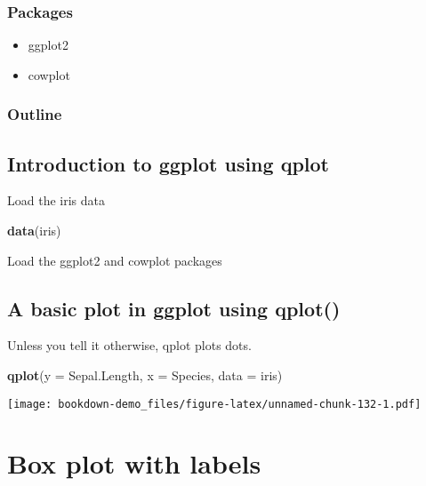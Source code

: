 \documentclass[]{book}
\newenvironment{Shaded}{\begin{snugshade}}{\end{snugshade}}
\newcommand{\KeywordTok}[1]{\textcolor[rgb]{0.13,0.29,0.53}{\textbf{#1}}}
\newcommand{\DataTypeTok}[1]{\textcolor[rgb]{0.13,0.29,0.53}{#1}}
\newcommand{\NormalTok}[1]{#1}
\providecommand{\tightlist}{%
  \setlength{\itemsep}{0pt}\setlength{\parskip}{0pt}}
\theoremstyle{definition}
\theoremstyle{definition}
\theoremstyle{definition}
\theoremstyle{remark}
\begin{document}
\subsection{Packages}\label{packages-5}

\begin{itemize}
\tightlist
\item
  ggplot2
\item
  cowplot
\end{itemize}

\subsection{Outline}\label{outline-1}

\section{Introduction to ggplot using
qplot}\label{introduction-to-ggplot-using-qplot}

Load the iris data

\begin{Shaded}
\begin{Highlighting}[]
\KeywordTok{data}\NormalTok{(iris)}
\end{Highlighting}
\end{Shaded}

Load the ggplot2 and cowplot packages

\section{A basic plot in ggplot using
qplot()}\label{a-basic-plot-in-ggplot-using-qplot}

Unless you tell it otherwise, qplot plots dots.

\begin{Shaded}
\begin{Highlighting}[]
\KeywordTok{qplot}\NormalTok{(}\DataTypeTok{y =}\NormalTok{ Sepal.Length,}
      \DataTypeTok{x =}\NormalTok{ Species,    }
        \DataTypeTok{data =}\NormalTok{ iris) }
\end{Highlighting}
\end{Shaded}

\texttt{[image: bookdown-demo\_files/figure-latex/unnamed-chunk-132-1.pdf]}

\chapter{Box plot with labels}\label{box-plot-with-labels}
\end{document}
